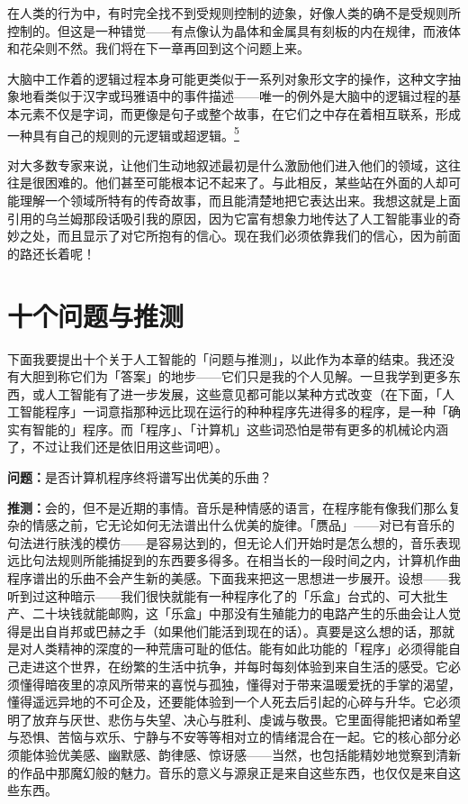 \documentclass[
  12pt,
  twoside,
  openright,
  oldfontcommands,
]{memoir}
\newcommand{\dialogname}[1]{{\heifamily\bfseries #1}}
\newenvironment{fsquote}{%
  \begin{mdframed}[style=gebquote]\kaitifamily\small%
}{%
  \end{mdframed}%
}
\begin{document}
在人类的行为中，有时完全找不到受规则控制的迹象，好像人类的确不是受规则所控制的。但这是一种错觉------有点像认为晶体和金属具有刻板的内在规律，而液体和花朵则不然。我们将在下一章再回到这个问题上来。

\begin{fsquote}
大脑中工作着的逻辑过程本身可能更类似于一系列对象形文字的操作，这种文字抽象地看类似于汉字或玛雅语中的事件描述------唯一的例外是大脑中的逻辑过程的基本元素不仅是字词，而更像是句子或整个故事，在它们之中存在着相互联系，形成一种具有自己的规则的元逻辑或超逻辑。\hyperref[fn:Chapter19-5]{\textsuperscript{5}}
\end{fsquote}

对大多数专家来说，让他们生动地叙述最初是什么激励他们进入他们的领域，这往往是很困难的。他们甚至可能根本记不起来了。与此相反，某些站在外面的人却可能理解一个领域所特有的传奇故事，而且能清楚地把它表达出来。我想这就是上面引用的乌兰姆那段话吸引我的原因，因为它富有想象力地传达了人工智能事业的奇妙之处，而且显示了对它所抱有的信心。现在我们必须依靠我们的信心，因为前面的路还长着呢！

\section{十个问题与推测}

下面我要提出十个关于人工智能的「问题与推测」，以此作为本章的结束。我还没有大胆到称它们为「答案」的地步------它们只是我的个人见解。一旦我学到更多东西，或人工智能有了进一步发展，这些意见都可能以某种方式改变（在下面，「人工智能程序」一词意指那种远比现在运行的种种程序先进得多的程序，是一种「确实有智能的」程序。而「程序」、「计算机」这些词恐怕是带有更多的机械论内涵了，不过让我们还是依旧用这些词吧）。

\dialogname{问题：}是否计算机程序终将谱写出优美的乐曲？

\dialogname{推测：}会的，但不是近期的事情。音乐是种情感的语言，在程序能有像我们那么复杂的情感之前，它无论如何无法谱出什么优美的旋律。「赝品」------对已有音乐的句法进行肤浅的模仿------是容易达到的，但无论人们开始时是怎么想的，音乐表现远比句法规则所能捕捉到的东西要多得多。在相当长的一段时间之内，计算机作曲程序谱出的乐曲不会产生新的美感。下面我来把这一思想进一步展开。设想------我听到过这种暗示------我们很快就能有一种程序化了的「乐盒」台式的、可大批生产、二十块钱就能邮购，这「乐盒」中那没有生殖能力的电路产生的乐曲会让人觉得是出自肖邦或巴赫之手（如果他们能活到现在的话）。真要是这么想的话，那就是对人类精神的深度的一种荒唐可耻的低估。能有如此功能的「程序」必须得能自己走进这个世界，在纷繁的生活中抗争，并每时每刻体验到来自生活的感受。它必须懂得暗夜里的凉风所带来的喜悦与孤独，懂得对于带来温暖爱抚的手掌的渴望，懂得遥远异地的不可企及，还要能体验到一个人死去后引起的心碎与升华。它必须明了放弃与厌世、悲伤与失望、决心与胜利、虔诚与敬畏。它里面得能把诸如希望与恐惧、苦恼与欢乐、宁静与不安等等相对立的情绪混合在一起。它的核心部分必须能体验优美感、幽默感、韵律感、惊讶感------当然，也包括能精妙地觉察到清新的作品中那魔幻般的魅力。音乐的意义与源泉正是来自这些东西，也仅仅是来自这些东西。
\end{document}
